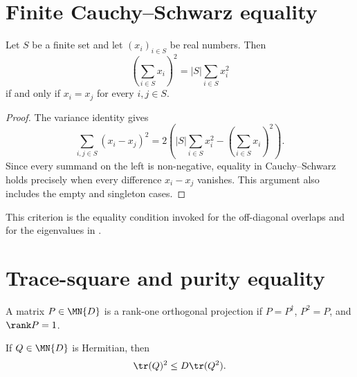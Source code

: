 \section{Finite Cauchy--Schwarz equality}

\begin{theorem}
    \label{thm:finite_cauchy_schwarz_equality}
    \leanok
    Let $S$ be a finite set and let $(x_i)_{i\in S}$ be real numbers. Then
    \[
        \left(\sum_{i\in S}x_i\right)^2
        =|S|\sum_{i\in S}x_i^2
    \]
    if and only if $x_i=x_j$ for every $i,j\in S$.
\end{theorem}

\begin{proof}\leanok
    The variance identity gives
    \[
        \sum_{i,j\in S}(x_i-x_j)^2
        =2\left(
        |S|\sum_{i\in S}x_i^2-
        \left(\sum_{i\in S}x_i\right)^2
        \right).
    \]
    Since every summand on the left is non-negative, equality in
    Cauchy--Schwarz holds precisely when every difference $x_i-x_j$ vanishes.
    This argument also includes the empty and singleton cases.
\end{proof}

This criterion is the equality condition invoked for the off-diagonal overlaps
and for the eigenvalues in \cite[Chapter~2, Proposition ``SIC POVMs'',
    equations~(2.31)--(2.32)]{Wolf2012Quantum}.

\section{Trace-square and purity equality}

\begin{definition}
    \label{def:sic_rank_one_orthogonal_projection}
    \leanok

    A matrix $P\in\MN{D}$ is a rank-one orthogonal projection if
    $P=P^\dagger$, $P^2=P$, and $\rank P=1$.
\end{definition}

\begin{theorem}
    \label{thm:sic_hermitian_trace_square}
    \leanok
    If $Q\in\MN{D}$ is Hermitian, then
    \begin{align}
        \tr(Q)^2\le D\tr(Q^2).
        \label{eq:sic_hermitian_trace_square}
    \end{align}
\end{theorem}

